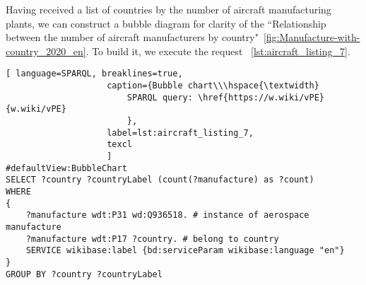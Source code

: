 
Having received a list of countries by the number of aircraft manufacturing plants, we can construct a bubble diagram 
for clarity of the ``Relationship between the number of aircraft manufacturers by country"~\ref{fig:Manufacture-with-country_2020_en}. 
To build it, we execute the request ~\ref{lst:aircraft_listing_7}.

\begin{lstlisting}[ language=SPARQL, breaklines=true, 
                    caption={Bubble chart\\\hspace{\textwidth}
                        SPARQL query: \href{https://w.wiki/vPE}{w.wiki/vPE}
                        },
                    label=lst:aircraft_listing_7,
                    texcl 
                    ]
#defaultView:BubbleChart
SELECT ?country ?countryLabel (count(?manufacture) as ?count)
WHERE
{
    ?manufacture wdt:P31 wd:Q936518. # instance of aerospace manufacture
  	?manufacture wdt:P17 ?country. # belong to country
    SERVICE wikibase:label {bd:serviceParam wikibase:language "en"}
}
GROUP BY ?country ?countryLabel
\end{lstlisting}

